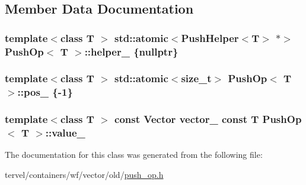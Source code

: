 \subsection{Member Data Documentation}
\hypertarget{class_push_op_a1178c6780368c2f964386abc81f90298}{}
\subsubsection[{helper\+\_\+}]{\setlength{\rightskip}{0pt plus 5cm}template$<$class T $>$ std\+::atomic$<${\bf Push\+Helper}$<$T$>$ $\ast$$>$ {\bf Push\+Op}$<$ T $>$\+::helper\+\_\+ \{nullptr\}}\label{class_push_op_a1178c6780368c2f964386abc81f90298}
\hypertarget{class_push_op_a0e4c04016077802998713feb9e5dc6fb}{}
\subsubsection[{pos\+\_\+}]{\setlength{\rightskip}{0pt plus 5cm}template$<$class T $>$ std\+::atomic$<$size\+\_\+t$>$ {\bf Push\+Op}$<$ T $>$\+::pos\+\_\+ \{-\/1\}}\label{class_push_op_a0e4c04016077802998713feb9e5dc6fb}
\hypertarget{class_push_op_af5df9efc25c3879d9178ccf9282de290}{}
\subsubsection[{value\+\_\+}]{\setlength{\rightskip}{0pt plus 5cm}template$<$class T $>$ const Vector vector\+\_\+ const T {\bf Push\+Op}$<$ T $>$\+::value\+\_\+}\label{class_push_op_af5df9efc25c3879d9178ccf9282de290}


The documentation for this class was generated from the following file\+:\begin{DoxyCompactItemize}
\item 
tervel/containers/wf/vector/old/\hyperlink{push__op_8h}{push\+\_\+op.\+h}\end{DoxyCompactItemize}
